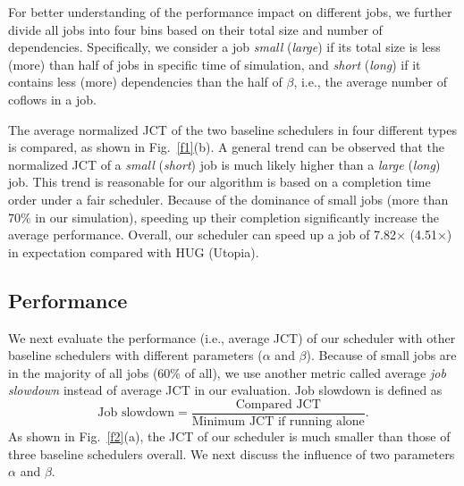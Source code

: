 \documentclass[10pt, conference, letterpaper]{IEEEtran}
\begin{document}
For better understanding of the performance impact on different jobs, we further divide all jobs into four bins based on their total size and number of dependencies. Specifically, we consider a job \emph{small} (\emph{large}) if its total size is less (more) than half of jobs in specific time of simulation, and \emph{short} (\emph{long}) if it contains less (more) dependencies than the half of $\beta$, i.e., the average number of coflows in a job.

The average normalized JCT of the two baseline schedulers in four different types is compared, as shown in Fig.~\ref{f1}(b). A general trend can be observed that the normalized JCT of a \emph{small} (\emph{short}) job is much likely higher than a \emph{large} (\emph{long}) job. This trend is reasonable for our algorithm is based on a completion time order under a fair scheduler. Because of the dominance of small jobs (more than 70\% in our simulation), speeding up their completion significantly increase the average performance. Overall, our scheduler can speed up a job of 7.82$\times$ (4.51$\times$) in expectation compared with HUG (Utopia).

\subsection{Performance}
We next evaluate the performance (i.e., average JCT) of our scheduler with other baseline schedulers with different parameters ($\alpha$ and $\beta$). Because of small jobs are in the majority of all jobs (60\% of all), %
we use another metric called average \emph{job slowdown} instead of average JCT in our evaluation. Job slowdown is defined as
\[\text{Job slowdown} = \frac{\text{Compared JCT}}{\text{Minimum JCT if running alone}}.\]
As shown in Fig.~\ref{f2}(a), the JCT of our scheduler is much smaller than those of three baseline schedulers overall. We next discuss the influence of two parameters $\alpha$ and $\beta$.
\end{document}
